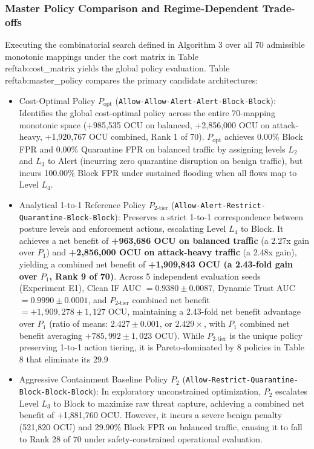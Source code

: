 \documentclass[journal,10pt,onecolumn]{IEEEtran}
\begin{document}
\subsubsection{Master Policy Comparison and Regime-Dependent Trade-offs}
Executing the combinatorial search defined in Algorithm 3 over all 70 admissible monotonic mappings under the cost matrix in Table~\\ref{tab:cost_matrix} yields the global policy evaluation. Table~\\ref{tab:master_policy} compares the primary candidate architectures:
\begin{itemize}
  \item Cost-Optimal Policy $P_{\text{opt}}$ (\texttt{Allow-Allow-Alert-Alert-Block-Block}): Identifies the global cost-optimal policy across the entire 70-mapping monotonic space (+985,535 OCU on balanced, +2,856,000 OCU on attack-heavy, +1,920,767 OCU combined, Rank 1 of 70). $P_{\text{opt}}$ achieves 0.00\% Block FPR and 0.00\% Quarantine FPR on balanced traffic by assigning levels $L_2$ and $L_3$ to Alert (incurring zero quarantine disruption on benign traffic), but incurs 100.00\% Block FPR under sustained flooding when all flows map to Level $L_4$.
  \item Analytical 1-to-1 Reference Policy $P_{2\text{-tier}}$ (\texttt{Allow-Alert-Restrict-Quarantine-Block-Block}): Preserves a strict 1-to-1 correspondence between posture levels and enforcement actions, escalating Level $L_4$ to Block. It achieves a net benefit of \textbf{+963,686 OCU on balanced traffic} (a 2.27x gain over $P_1$) and \textbf{+2,856,000 OCU on attack-heavy traffic} (a 2.48x gain), yielding a combined net benefit of \textbf{+1,909,843 OCU (a 2.43-fold gain over $P_1$, Rank 9 of 70)}. Across 5 independent evaluation seeds (Experiment E1), Clean IF AUC $= 0.9380 \pm 0.0087$, Dynamic Trust AUC $= 0.9990 \pm 0.0001$, and $P_{2\text{-tier}}$ combined net benefit $= +1,909,278 \pm 1,127\text{ OCU}$, maintaining a 2.43-fold net benefit advantage over $P_1$ (ratio of means: $2.427 \pm 0.001$, or $2.429\times$, with $P_1$ combined net benefit averaging $+785,992 \pm 1,023\text{ OCU}$). While $P_{2\text{-tier}}$ is the unique policy preserving 1-to-1 action tiering, it is Pareto-dominated by 8 policies in Table 8 that eliminate its 29.9%
  \item Aggressive Containment Baseline Policy $P_2$ (\texttt{Allow-Restrict-Quarantine-Block-Block-Block}): In exploratory unconstrained optimization, $P_2$ escalates Level $L_3$ to Block to maximize raw threat capture, achieving a combined net benefit of +1,881,760 OCU. However, it incurs a severe benign penalty (521,820 OCU) and 29.90\% Block FPR on balanced traffic, causing it to fall to Rank 28 of 70 under safety-constrained operational evaluation.

\end{itemize}
\end{document}
